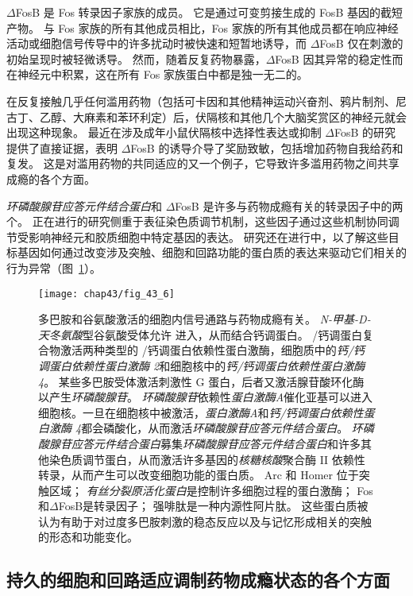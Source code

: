 $\Delta$FosB 是 Fos 转录因子家族的成员。
它是通过可变剪接生成的 FosB 基因的截短产物。
与 Fos 家族的所有其他成员相比，Fos 家族的所有其他成员都在响应神经活动或细胞信号传导中的许多扰动时被快速和短暂地诱导，而 $\Delta$FosB 仅在刺激的初始呈现时被轻微诱导。
然而，随着反复药物暴露，$\Delta$FosB 因其异常的稳定性而在神经元中积累，这在所有 Fos 家族蛋白中都是独一无二的。


在反复接触几乎任何滥用药物（包括可卡因和其他精神运动兴奋剂、鸦片制剂、尼古丁、乙醇、大麻素和苯环利定）后，伏隔核和其他几个大脑奖赏区的神经元就会出现这种现象。
最近在涉及成年小鼠伏隔核中选择性表达或抑制 $\Delta$FosB 的研究提供了直接证据，表明 $\Delta$FosB 的诱导介导了奖励致敏，包括增加药物自我给药和复发。
这是对滥用药物的共同适应的又一个例子，它导致许多滥用药物之间共享成瘾的各个方面。


\textit{环磷酸腺苷应答元件结合蛋白}和 $\Delta$FosB 是许多与药物成瘾有关的转录因子中的两个。
正在进行的研究侧重于表征染色质调节机制，这些因子通过这些机制协同调节受影响神经元和胶质细胞中特定基因的表达。
研究还在进行中，以了解这些目标基因如何通过改变涉及突触、细胞和回路功能的蛋白质的表达来驱动它们相关的行为异常（图~\ref{fig:43_6}）。


\begin{figure}[htbp]
	\centering
	\texttt{[image: chap43/fig\_43\_6]}
	\caption{多巴胺和谷氨酸激活的细胞内信号通路与药物成瘾有关。
		\textit{N-甲基-D-天冬氨酸}型谷氨酸受体允许  进入，从而结合钙调蛋白。
		/钙调蛋白复合物激活两种类型的 /钙调蛋白依赖性蛋白激酶，细胞质中的\textit{钙/钙调蛋白依赖性蛋白激酶 2}和细胞核中的\textit{钙/钙调蛋白依赖性蛋白激酶 4}。
		某些多巴胺受体激活刺激性 G 蛋白，后者又激活腺苷酸环化酶以产生\textit{环磷酸腺苷}。
		\textit{环磷酸腺苷}依赖性\textit{蛋白激酶A}催化亚基可以进入细胞核。一旦在细胞核中被激活，\textit{蛋白激酶A}和\textit{钙/钙调蛋白依赖性蛋白激酶 4}都会磷酸化，从而激活\textit{环磷酸腺苷应答元件结合蛋白}。
		\textit{环磷酸腺苷应答元件结合蛋白}募集\textit{环磷酸腺苷应答元件结合蛋白}和许多其他染色质调节蛋白，从而激活许多基因的\textit{核糖核酸}聚合酶 II 依赖性转录，从而产生可以改变细胞功能的蛋白质。
		Arc 和 Homer 位于突触区域；
		\textit{有丝分裂原活化蛋白}是控制许多细胞过程的蛋白激酶；
		Fos和$\Delta$FosB是转录因子；
		强啡肽是一种内源性阿片肽。
		这些蛋白质被认为有助于对过度多巴胺刺激的稳态反应以及与记忆形成相关的突触的形态和功能变化。}
	\label{fig:43_6}
\end{figure}



\subsection{持久的细胞和回路适应调制药物成瘾状态的各个方面}

